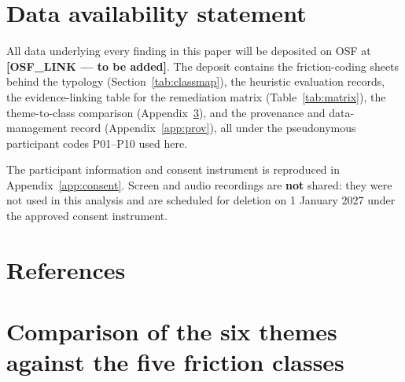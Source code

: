 \documentclass[]{interact}
\theoremstyle{plain}
\begin{document}
\section{Data availability statement}

All data underlying every finding in this paper will be deposited on OSF at
\textbf{[OSF\_LINK --- to be added]}. The deposit contains the friction-coding sheets behind the
typology (Section~\ref{tab:classmap}), the heuristic evaluation records, the evidence-linking table for
the remediation matrix (Table~\ref{tab:matrix}), the theme-to-class comparison (Appendix~\ref{app:themeclass}),
and the provenance and data-management record (Appendix~\ref{app:prov}), all under the pseudonymous
participant codes P01--P10 used here.

The participant information and consent instrument is reproduced in Appendix~\ref{app:consent}. Screen
and audio recordings are \textbf{not} shared: they were not used in this analysis and are scheduled for
deletion on 1 January 2027 under the approved consent instrument.

\section{References}




\appendix

\section{Comparison of the six themes against the five friction classes}
\label{app:themeclass}
\end{document}
